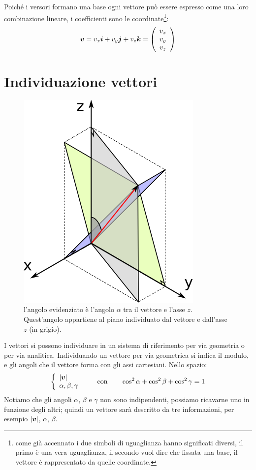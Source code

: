 Poiché i versori formano una base ogni vettore può essere espresso come una loro combinazione lineare, i coefficienti sono le coordinate\footnote{come già accennato i due simboli di uguaglianza hanno significati diversi, il primo è una vera uguaglianza, il secondo vuol dire che fissata una base, il vettore è rappresentato da quelle coordinate.}:
\[
  \boldsymbol{v}=v_x\boldsymbol{i}+v_y\boldsymbol{j}+v_z\boldsymbol{k}=\left(
  \begin{array}{c}
      v_x \\v_y\\v_z\\
    \end{array}\right)
\]
\section{Individuazione vettori}
\begin{figure}[htbp]
  \centering
  \includegraphics{immagini/fisica1/vettore_geometrico}
  \caption{l'angolo evidenziato è l'angolo $\alpha$ tra il vettore e l'asse $z$. Quest'angolo appartiene al piano individuato dal vettore e dall'asse $z$ (in grigio).}
\end{figure}
I vettori si possono individuare in un sistema di riferimento per via geometria o per via analitica. Individuando un vettore per via geometrica si indica il modulo, e gli angoli che il vettore forma con gli assi cartesiani. Nello spazio:
\[
  \left\{
  \begin{array}{l}
    |\boldsymbol{v}| \\
    \alpha,\beta,\gamma
  \end{array}\right. \qquad \text{con}\qquad \cos^2 \alpha+\cos^2 \beta + \cos^2
  \gamma=1
\]
Notiamo che gli angoli $\alpha$, $\beta$ e $\gamma$ non sono indipendenti, possiamo ricavarne uno in funzione degli altri; quindi un vettore sarà descritto da tre informazioni, per esempio $|\boldsymbol{v}|$, $\alpha$, $\beta$.

